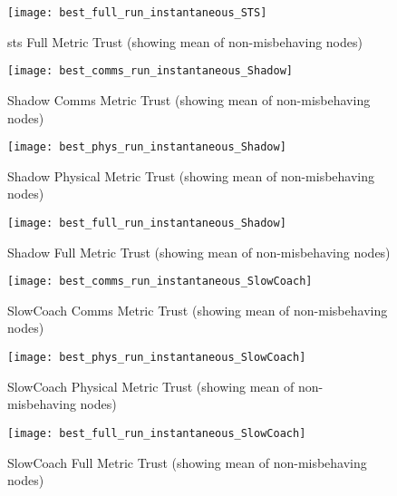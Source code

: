 \begin{figure}[h]
  \centering
  \texttt{[image: best\_full\_run\_instantaneous\_STS]}
  \caption{\gls{sts} Full Metric Trust (showing mean of non-misbehaving nodes)}
  \label{fig:full_instantaneous_sts}
\end{figure}



\begin{figure}[h]
  \centering
  \texttt{[image: best\_comms\_run\_instantaneous\_Shadow]}
  \caption{Shadow Comms Metric Trust (showing mean of non-misbehaving nodes)}
  \label{fig:comms_instantaneous_shadow}
\end{figure}

\begin{figure}[h]
  \centering
  \texttt{[image: best\_phys\_run\_instantaneous\_Shadow]}
  \caption{Shadow Physical Metric Trust (showing mean of non-misbehaving nodes)}
  \label{fig:phys_instantaneous_shadow}
\end{figure}

\begin{figure}[h]
  \centering
  \texttt{[image: best\_full\_run\_instantaneous\_Shadow]}
  \caption{Shadow Full Metric Trust (showing mean of non-misbehaving nodes)}
  \label{fig:full_instantaneous_shadow}
\end{figure}



\begin{figure}[h]
  \centering
  \texttt{[image: best\_comms\_run\_instantaneous\_SlowCoach]}
  \caption{SlowCoach Comms Metric Trust (showing mean of non-misbehaving nodes)}
  \label{fig:comms_instantaneous_slowcoach}
\end{figure}

\begin{figure}[h]
  \centering
  \texttt{[image: best\_phys\_run\_instantaneous\_SlowCoach]}
  \caption{SlowCoach Physical Metric Trust (showing mean of non-misbehaving nodes)}
  \label{fig:phys_instantaneous_slowcoach}
\end{figure}

\begin{figure}[h]
  \centering
  \texttt{[image: best\_full\_run\_instantaneous\_SlowCoach]}
  \caption{SlowCoach Full Metric Trust (showing mean of non-misbehaving nodes)}
  \label{fig:full_instantaneous_slowcoach}
\end{figure}

